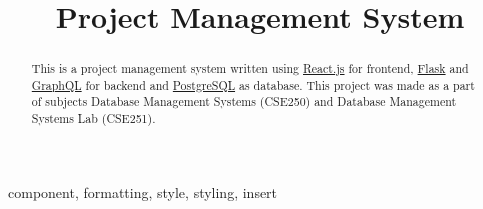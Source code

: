 \documentclass[conference]{IEEEtran}
\begin{document}
\title{Project Management System}

\author{
  \and
  \and
}

\maketitle

\begin{abstract}
This is a project management system written using \href{https://reactjs.org/}{React.js} for frontend, \href{https://flask.palletsprojects.com/en/1.1.x/}{Flask} and \href{https://graphql.org/}{GraphQL} for backend and \href{https://www.postgresql.org/}{PostgreSQL} as database. This project was made as a part of subjects Database Management Systems (CSE250) and Database Management Systems Lab (CSE251).
\end{abstract}

\begin{IEEEkeywords}
  component, formatting, style, styling, insert
\end{IEEEkeywords}
\end{document}
